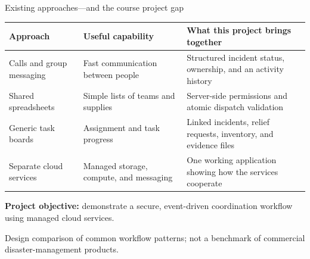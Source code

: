 \documentclass[aspectratio=169,10pt]{beamer}
\begin{document}
\begin{frame}{Existing approaches---and the course project gap}
\small
\begin{tabularx}{\textwidth}{@{}P{2.7cm}P{3.6cm}Y@{}}
\toprule
\textbf{Approach} & \textbf{Useful capability} & \textbf{What this project brings together}\\\midrule
Calls and group messaging & Fast communication between people & Structured incident status, ownership, and an activity history\\\addlinespace[.2cm]
Shared spreadsheets & Simple lists of teams and supplies & Server-side permissions and atomic dispatch validation\\\addlinespace[.2cm]
Generic task boards & Assignment and task progress & Linked incidents, relief requests, inventory, and evidence files\\\addlinespace[.2cm]
Separate cloud services & Managed storage, compute, and messaging & One working application showing how the services cooperate\\\bottomrule
\end{tabularx}\par
\vspace{.4cm}
\textbf{Project objective:} demonstrate a secure, event-driven coordination workflow using managed cloud services.
\vspace{.2cm}

{\scriptsize\color{QFSlate}Design comparison of common workflow patterns; not a benchmark of commercial disaster-management products.}
\end{frame}
\end{document}
